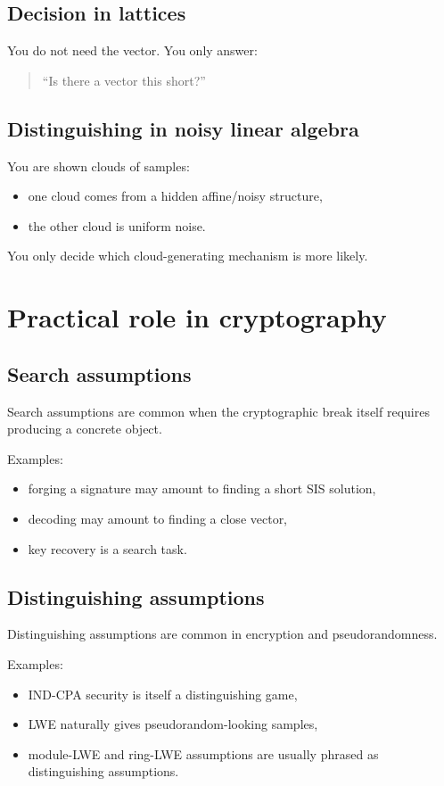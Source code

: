 \documentclass[11pt]{article}
\begin{document}
	\subsection{Decision in lattices}
	
	You do not need the vector. You only answer:
	\begin{quote}
		``Is there a vector this short?''
	\end{quote}
	
	\subsection{Distinguishing in noisy linear algebra}
	
	You are shown clouds of samples:
	\begin{itemize}
		\item one cloud comes from a hidden affine/noisy structure,
		\item the other cloud is uniform noise.
	\end{itemize}
	You only decide which cloud-generating mechanism is more likely.
	
	\section{Practical role in cryptography}
	
	\subsection{Search assumptions}
	
	Search assumptions are common when the cryptographic break itself requires producing a concrete object.
	
	Examples:
	\begin{itemize}
		\item forging a signature may amount to finding a short SIS solution,
		\item decoding may amount to finding a close vector,
		\item key recovery is a search task.
	\end{itemize}
	
	\subsection{Distinguishing assumptions}
	
	Distinguishing assumptions are common in encryption and pseudorandomness.
	
	Examples:
	\begin{itemize}
		\item IND-CPA security is itself a distinguishing game,
		\item LWE naturally gives pseudorandom-looking samples,
		\item module-LWE and ring-LWE assumptions are usually phrased as distinguishing assumptions.
	\end{itemize}
	
\end{document}
